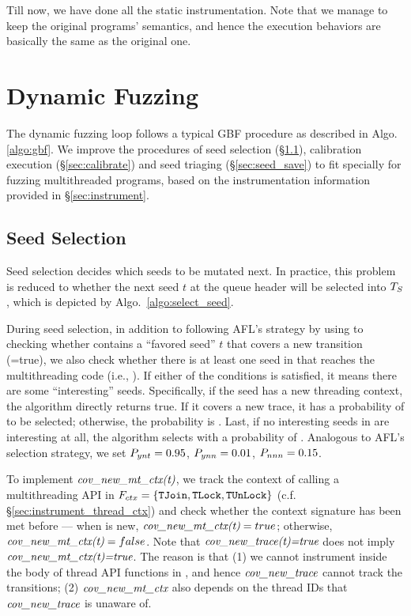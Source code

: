 Till now, we have done all the static instrumentation. Note that we manage to keep the original programs' semantics, and hence the execution behaviors are basically the same as the original one.

\section{Dynamic Fuzzing}\label{sec:fuzz}
The dynamic fuzzing loop follows a typical GBF procedure as described in Algo.\ref{algo:gbf}. We improve the procedures of seed selection (\S\ref{sec:seed_select}),
calibration execution (\S\ref{sec:calibrate}) and seed triaging (\S\ref{sec:seed_save}) to fit specially for fuzzing multithreaded programs, based on the instrumentation information provided in \S\ref{sec:instrument}.

\subsection{Seed Selection}\label{sec:seed_select}

Seed selection decides which seeds to be mutated next. In practice, this problem is reduced to whether the next seed $t$ at the queue header will be selected into $T_{S}$, which is depicted by Algo.~\ref{algo:select_seed}.






During seed selection, in addition to following AFL's strategy by using  to  checking whether \Seeds contains a ``favored seed'' $t$ that covers a new transition (=true), we also check whether there is at least one seed in \Seeds that reaches the multithreading code (i.e., ). If either of the conditions is satisfied, it means there are some ``interesting'' seeds.
Specifically, if the seed has a new threading context, the algorithm directly returns  true. If it covers a new trace, it has a probability of \probYNT to be selected; otherwise, the probability is \probYNN. Last, if no interesting seeds in \Seeds are interesting at all, the algorithm selects with a probability of \probNNN. Analogous to AFL's selection strategy, we set $P_{ynt}=0.95$, $P_{ynn}=0.01$, $P_{nnn}=0.15$.

To implement $\emph{cov\_new\_mt\_ctx(t)}$, we track the context of calling a multithreading API in $F_{ctx}=\{\texttt{TJoin}, \texttt{TLock}, \texttt{TUnLock}\}$ (c.f. \S\ref{sec:instrument_thread_ctx}) and check whether the  context signature \tctxSign has been met before ---  when \tctxSign is new, $\emph{cov\_new\_mt\_ctx(t)}=true$; otherwise, $\emph{cov\_new\_mt\_ctx(t)}=false$. Note that $\emph{cov\_new\_trace(t)=true}$ does not imply $\emph{cov\_new\_mt\_ctx(t)=true}$. The reason is that (1) we cannot instrument inside the body of thread API functions in \FSThread, and hence $\emph{cov\_new\_trace}$ cannot track the transitions; (2) $\emph{cov\_new\_mt\_ctx}$ also depends on the thread IDs that $\emph{cov\_new\_trace}$ is unaware of.  












